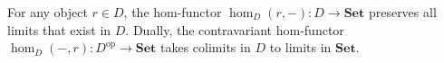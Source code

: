 For any object $r \in D$, the hom-functor $\hom_D(r, -): D \rightarrow \mathbf{Set}$ preserves all limits that exist in $D$. Dually, the contravariant hom-functor $\hom_D(-, r): D^{\text{op}} \rightarrow \mathbf{Set}$ takes colimits in $D$ to limits in $\mathbf{Set}$.